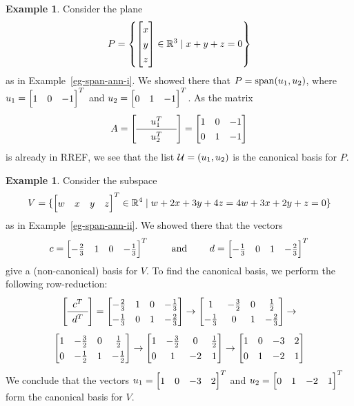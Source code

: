 \documentclass[reqno]{amsart}
\theoremstyle{definition}
\newtheorem{example}[theorem]{Example}
\begin{document}
\begin{example}\label{eg-span-ann-i-canonical}
 Consider the plane
 \[ P = \left\{\bbm x\\ y\\ z\ebm \in\R^3\st x+y+z= 0\right\}  \]
 as in Example~\ref{eg-span-ann-i}.  We showed there that
 $P=\operatorname{span}(u_1,u_2)$, where $u_1=\bbm 1&0&-1\ebm^T$ and
 $u_2=\bbm 0&1&-1\ebm^T$.  As the matrix
 \[ A = {\renewcommand{\arraystretch}{1.3}
        \left[\begin{array}{ccc}
         & u_1^T & \\ \hline
         & u_2^T &
        \end{array}\right]}
      = \bbm 1 & 0 & -1 \\ 0 & 1 & -1 \ebm
 \]
 is already in RREF, we see that the list $\mathcal{U}=(u_1,u_2)$ is the
 canonical basis for $P$.
\end{example}

\begin{example}\label{eg-span-ann-ii-canonical}
 Consider the subspace
 \[ V = \{\bbm w&x&y&z\ebm^T\in\R^4\st w+2x+3y+4z=4w+3x+2y+z=0\}  \]
 as in Example~\ref{eg-span-ann-ii}.  We showed there that the vectors
 \[ c = \bbm -\tfrac{2}{3} & 1 & 0 & -\tfrac{1}{3} \ebm^T
    \hspace{2em} \text{ and } \hspace{2em}
    d = \bbm -\tfrac{1}{3} & 0 & 1 & -\tfrac{2}{3} \ebm^T
 \]
 give a (non-canonical) basis for $V$.  To find the canonical basis,
 we perform the following row-reduction:
 \[ {\renewcommand{\arraystretch}{1.3}
     \left[\begin{array}{c} c^T \\ \hline d^T \end{array}\right]}
    =
    \bbm -\tfrac{2}{3} & 1 & 0 & -\tfrac{1}{3} \\
         -\tfrac{1}{3} & 0 & 1 & -\tfrac{2}{3} \ebm
    \to
    \bbm 1 & -\tfrac{3}{2} & 0 & \tfrac{1}{2} \\
         -\tfrac{1}{3} & 0 & 1 & -\tfrac{2}{3} \ebm
    \to
 \] \[
    \bbm 1 & -\tfrac{3}{2} & 0 & \tfrac{1}{2} \\
         0 & -\tfrac{1}{2} & 1 & -\tfrac{1}{2} \ebm
    \to
    \bbm 1 & -\tfrac{3}{2} & 0  & \tfrac{1}{2} \\
         0 & 1             & -2 & 1 \ebm
    \to
    \bbm 1 & 0 & -3 & 2 \\
         0 & 1 & -2 & 1 \ebm
 \]
 We conclude that the vectors $u_1=\bbm 1 & 0 & -3 & 2\ebm^T$ and
 $u_2=\bbm 0&1&-2&1\ebm^T$ form the canonical basis for $V$.
\end{example}
\end{document}
